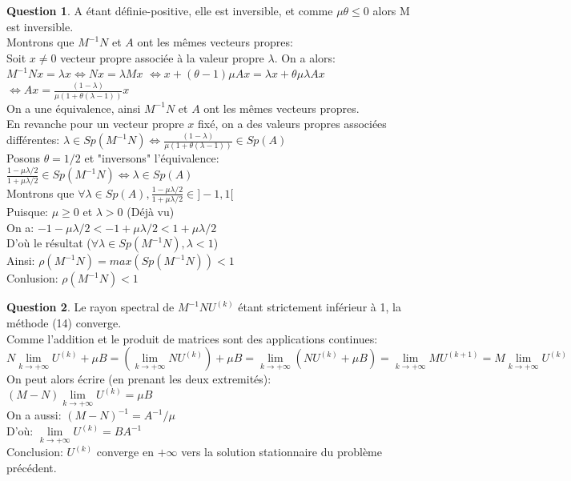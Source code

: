 \documentclass[a4paper]{article}
\theoremstyle{definition}
\newtheorem{que}{Question}
\begin{document}
	\begin{que}
		A étant définie-positive, elle est inversible, et comme $\mu \theta \leq 0$ alors M est inversible. \\
		Montrons que $M^{-1}N$ et $A$ ont les mêmes vecteurs propres: \\
		Soit $x \neq 0$ vecteur propre associée à la valeur propre $\lambda$.
		On a alors: \\
		$M^{-1}Nx=\lambda x \Leftrightarrow Nx=\lambda Mx$
		$\Leftrightarrow x +(\theta - 1) \mu A x = \lambda x + \theta \mu \lambda Ax$
		$\Leftrightarrow  Ax = \frac{(1 - \lambda)}{\mu(1+\theta(\lambda - 1))} x$ \\
		On a une équivalence, ainsi $M^{-1}N$ et $A$ ont les mêmes vecteurs propres.\\
		En revanche pour un vecteur propre $x$ fixé, on a des valeurs propres associées différentes: $\lambda \in Sp(M^{-1}N) \Leftrightarrow \frac{(1 - \lambda)}{\mu(1+\theta(\lambda - 1))} \in Sp(A)$ \\

		Posons $\theta = 1/2$ et "inversons" l'équivalence: \\
		$\frac{1 - \mu \lambda / 2}{1 + \mu \lambda / 2} \in Sp(M^{-1}N) \Leftrightarrow \lambda \in Sp(A)$ \\

		Montrons que $\forall \lambda \in Sp(A), \frac{1 - \mu \lambda / 2}{1 + \mu \lambda / 2} \in ]-1, 1[$ \\
		Puisque: $\mu \ge 0$ et $\lambda > 0$ (Déjà vu) \\
		On a: $ -1 -\mu \lambda/2 < -1 + \mu \lambda / 2 < 1 +\mu \lambda / 2$ \\
		D'où le résultat ($\forall \lambda \in Sp(M^{-1}N), \lambda < 1$) \\

		Ainsi: $\rho(M^{-1}N) = max(Sp(M^{-1}N)) < 1$ \\
		Conlusion: $\rho(M^{-1}N) < 1$
	\end{que}
	\begin{que}
		Le rayon spectral de $M^{-1}N U^{(k)}$ étant strictement inférieur à 1, la méthode (14) converge. \\

		Comme l'addition et le produit de matrices sont des applications continues: \\
		$N\lim\limits_{k \to +\infty} U^{(k)} + \mu B = (\lim\limits_{k \to +\infty} NU^{(k)}) + \mu B = \lim\limits_{k \to +\infty} (NU^{(k)} + \mu B) = \lim\limits_{k \to +\infty} MU^{(k+1)} = M\lim\limits_{k \to +\infty} U^{(k)}$ \\
		On peut alors écrire (en prenant les deux extremités): $(M-N) \lim\limits_{k \to +\infty} U^{(k)}=\mu B$ \\

		On a aussi: $(M-N)^{-1} = A^{-1} / \mu$ \\
		D'où: $\lim\limits_{k \to +\infty} U^{(k)} = BA^{-1}$ \\
		Conclusion: $U^{(k)}$ converge en $+\infty$ vers la solution stationnaire du problème précédent.
	\end{que}
	\setcounter{que}{10}
\end{document}

